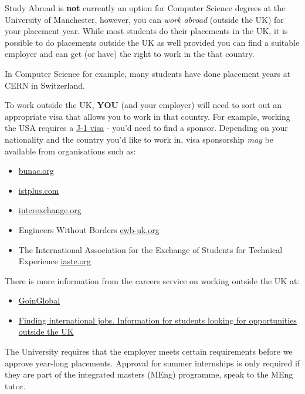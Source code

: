 \documentclass[
]{book}
\providecommand{\tightlist}{%
  \setlength{\itemsep}{0pt}\setlength{\parskip}{0pt}}
\begin{document}
Study Abroad is \textbf{not} currently an option for Computer Science degrees at the University of Manchester, however, you can \emph{work abroad} (outside the UK) for your placement year. While most students do their placements in the UK, it is possible to do placements outside the UK as well provided you can find a suitable employer and can get (or have) the right to work in the that country.

In Computer Science for example, many students have done placement years at CERN in Switzerland. \citep{cern}

To work outside the UK, \textbf{YOU} (and your employer) will need to sort out an appropriate visa that allows you to work in that country. For example, working the USA requires a \href{https://en.wikipedia.org/wiki/J-1_visa}{J-1 visa} - you'd need to find a sponsor. Depending on your nationality and the country you'd like to work in, visa sponsorship \emph{may} be available from organisations such as:

\begin{itemize}
\tightlist
\item
  \href{https://bunac.org}{bunac.org}
\item
  \href{https://istplus.com}{istplus.com}
\item
  \href{https://www.interexchange.org}{interexchange.org}
\item
  Engineers Without Borders \href{https://www.ewb-uk.org}{ewb-uk.org}
\item
  The International Association for the Exchange of Students for Technical Experience \href{https://iaeste.org}{iaste.org}
\end{itemize}

There is more information from the careers service on working outside the UK at:

\begin{itemize}
\tightlist
\item
  \href{https://www.careers.manchester.ac.uk/international/goinglobal/}{GoinGlobal} \citep{goinglobal}
\item
  \href{https://www.careers.manchester.ac.uk/international/internationaljobs/}{Finding international jobs. Information for students looking for opportunities outside the UK} \citep{interjobs}
\end{itemize}

The University requires that the employer meets certain requirements before we approve year-long placements. Approval for summer internships is only required if they are part of the integrated masters (MEng) programme, speak to the MEng tutor.
\end{document}
